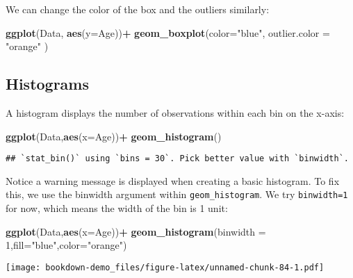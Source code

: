 \documentclass[
]{book}
\newenvironment{Shaded}{\begin{snugshade}}{\end{snugshade}}
\newcommand{\AttributeTok}[1]{\textcolor[rgb]{0.13,0.29,0.53}{#1}}
\newcommand{\DecValTok}[1]{\textcolor[rgb]{0.00,0.00,0.81}{#1}}
\newcommand{\FunctionTok}[1]{\textcolor[rgb]{0.13,0.29,0.53}{\textbf{#1}}}
\newcommand{\NormalTok}[1]{#1}
\newcommand{\SpecialCharTok}[1]{\textcolor[rgb]{0.81,0.36,0.00}{\textbf{#1}}}
\newcommand{\StringTok}[1]{\textcolor[rgb]{0.31,0.60,0.02}{#1}}
\begin{document}
We can change the color of the box and the outliers similarly:

\begin{Shaded}
\begin{Highlighting}[]
\FunctionTok{ggplot}\NormalTok{(Data, }\FunctionTok{aes}\NormalTok{(}\AttributeTok{y=}\NormalTok{Age))}\SpecialCharTok{+}
  \FunctionTok{geom\_boxplot}\NormalTok{(}\AttributeTok{color=}\StringTok{"blue"}\NormalTok{, }\AttributeTok{outlier.color =} \StringTok{"orange"}\NormalTok{ )}
\end{Highlighting}
\end{Shaded}

\hypertarget{histograms}{%
\subsection{Histograms}\label{histograms}}

A histogram displays the number of observations within each bin on the x-axis:

\begin{Shaded}
\begin{Highlighting}[]
\FunctionTok{ggplot}\NormalTok{(Data,}\FunctionTok{aes}\NormalTok{(}\AttributeTok{x=}\NormalTok{Age))}\SpecialCharTok{+}
  \FunctionTok{geom\_histogram}\NormalTok{()}
\end{Highlighting}
\end{Shaded}

\begin{verbatim}
## `stat_bin()` using `bins = 30`. Pick better value with `binwidth`.
\end{verbatim}

Notice a warning message is displayed when creating a basic histogram. To fix this, we use the binwidth argument within \texttt{geom\_histogram}. We try \texttt{binwidth=1} for now, which means the width of the bin is 1 unit:

\begin{Shaded}
\begin{Highlighting}[]
\FunctionTok{ggplot}\NormalTok{(Data,}\FunctionTok{aes}\NormalTok{(}\AttributeTok{x=}\NormalTok{Age))}\SpecialCharTok{+}
  \FunctionTok{geom\_histogram}\NormalTok{(}\AttributeTok{binwidth =} \DecValTok{1}\NormalTok{,}\AttributeTok{fill=}\StringTok{"blue"}\NormalTok{,}\AttributeTok{color=}\StringTok{"orange"}\NormalTok{)}
\end{Highlighting}
\end{Shaded}

\texttt{[image: bookdown-demo\_files/figure-latex/unnamed-chunk-84-1.pdf]}
\end{document}
